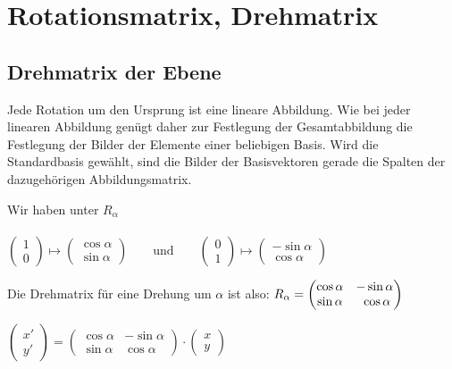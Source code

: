 \section{Rotationsmatrix, Drehmatrix}

\subsection{Drehmatrix der Ebene}
Jede Rotation um den Ursprung ist eine lineare Abbildung. Wie bei jeder linearen Abbildung genügt daher zur Festlegung der Gesamtabbildung die Festlegung der Bilder der Elemente einer beliebigen Basis. Wird die Standardbasis gewählt, sind die Bilder der Basisvektoren gerade die Spalten der dazugehörigen Abbildungsmatrix.

Wir haben unter $R_{\alpha}$ \\
\\
 $\begin{pmatrix} 1 \\ 0 \end{pmatrix} \mapsto \begin{pmatrix} \cos\alpha \\ \sin\alpha \end{pmatrix}
\qquad\text{und}\qquad
\begin{pmatrix} 0 \\ 1 \end{pmatrix} \mapsto \begin{pmatrix} -\sin\alpha \\ \cos\alpha \end{pmatrix}$ \newline

Die Drehmatrix für eine Drehung um $\alpha$ ist also:  \newline
$R_\alpha = \begin{pmatrix} \cos\alpha & -\sin\alpha \\ \sin\alpha & \newline \cos\alpha\end{pmatrix}$

 $\begin{pmatrix} x' \\ y' \end{pmatrix} = \begin{pmatrix} \cos\alpha & -\sin\alpha \\ \sin\alpha & \cos\alpha\end{pmatrix} \cdot \begin{pmatrix} x \\y \end{pmatrix}$\\

